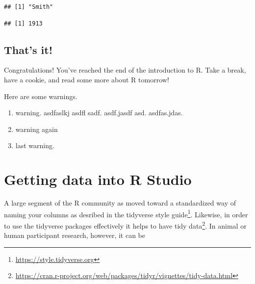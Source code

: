 \documentclass[
]{krantz}
\makeatletter
\newenvironment{Shaded}{\begin{snugshade}}{\end{snugshade}}
\newcommand{\KeywordTok}[1]{\textcolor[rgb]{0.27,0.27,0.27}{\textbf{#1}}}
\newcommand{\NormalTok}[1]{#1}
\newcommand{\OperatorTok}[1]{\textcolor[rgb]{0.43,0.43,0.43}{\textbf{#1}}}
\renewcommand{\href}[2]{#2\footnote{\url{#1}}}
\newenvironment{kframe}{%
\medskip{}
\setlength{\fboxsep}{.8em}
 \def\at@end@of@kframe{}%
 \ifinner\ifhmode%
  \def\at@end@of@kframe{\end{minipage}}%
  \begin{minipage}{\columnwidth}%
 \fi\fi%
 \def\FrameCommand##1{\hskip\@totalleftmargin \hskip-\fboxsep
 \colorbox{shadecolor}{##1}\hskip-\fboxsep
     \hskip-\linewidth \hskip-\@totalleftmargin \hskip\columnwidth}%
 \MakeFramed {\advance\hsize-\width
   \@totalleftmargin\z@ \linewidth\hsize
   \@setminipage}}%
 {\par\unskip\endMakeFramed%
 \at@end@of@kframe}
\newenvironment{rmdblock}[1]
  {
  \begin{itemize}
  \renewcommand{\labelitemi}{
    \raisebox{-.7\height}[0pt][0pt]{
      {\setkeys{Gin}{width=3em,keepaspectratio}\texttt{[image: images/\#1]}}
    }
  }
  \setlength{\fboxsep}{1em}
  \begin{kframe}
  \item
  }
  {
  \end{kframe}
  \end{itemize}
  }
\newenvironment{rmdcaution}
  {\begin{rmdblock}{caution}}
  {\end{rmdblock}}
\renewenvironment{Shaded}{\begin{kframe}}{\end{kframe}}
\makeatother
\begin{document}
\begin{Shaded}
\end{Shaded}

\begin{verbatim}
## [1] "Smith"
\end{verbatim}

\begin{Shaded}
\end{Shaded}

\begin{verbatim}
## [1] 1913
\end{verbatim}

\hypertarget{thats-it}{%
\section{That's it!}\label{thats-it}}

Congratulations! You've reached the end of the introduction to R. Take a break, have a cookie, and read some more about R tomorrow!

\begin{rmdcaution}
\begin{rmdcaution}

Here are some warnings.

\begin{enumerate}
\def\labelenumi{\arabic{enumi}.}
\item
  warning. asdfaslkj asdfl sadf. asdf.jasdf asd. asdfas.jdas.
\item
  warning again
\item
  last warning.
\end{enumerate}

\end{rmdcaution}
\end{rmdcaution}

\hypertarget{getting-data-into-r-studio}{%
\chapter{Getting data into R Studio}\label{getting-data-into-r-studio}}

A large segment of the R community as moved toward a standardized way of naming your columns as desribed in the \href{https://style.tidyverse.org}{tidyverse style guide}. Likewise, in order to use the tidyverse packages effectively it helps to have \href{https://cran.r-project.org/web/packages/tidyr/vignettes/tidy-data.html}{tidy data}. In animal or human participant research, however, it can be
\end{document}
